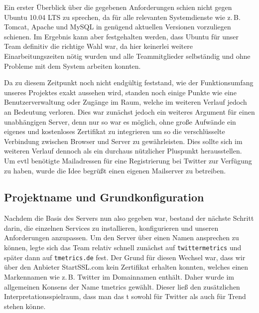 Ein erster Überblick über die gegebenen Anforderungen schien nicht gegen Ubuntu 10.04 LTS zu sprechen, da für alle relevanten Systemdienste wie z.\,B. Tomcat, Apache und MySQL in genügend aktuellen Versionen vorzuliegen schienen.
Im Ergebnis kann aber festgehalten werden, dass Ubuntu für unser Team definitiv die richtige Wahl war, da hier keinerlei weitere Einarbeitungszeiten nötig wurden und alle Teammitglieder selbständig und ohne Probleme mit dem System arbeiten konnten.

Da zu diesem Zeitpunkt noch nicht endgültig feststand, wie der Funktionsumfang unseres Projektes exakt aussehen wird, standen noch einige Punkte wie eine Benutzerverwaltung oder Zugänge im Raum, welche im weiteren Verlauf jedoch an Bedeutung verloren. Dies war zunächst jedoch ein weiteres Argument für einen unabhängigen Server, denn nur so war es möglich, ohne große Aufwände ein eigenes und kostenloses Zertifikat zu integrieren um so die verschlüsselte Verbindung zwischen Browser und Server zu gewährleisten. Dies sollte sich im weiteren Verlauf dennoch als ein durchaus nützlicher Pluspunkt herausstellen.
Um evtl benötigte Mailadressen für eine Registrierung bei Twitter zur Verfügung zu haben, wurde die Idee begrüßt einen eigenen Mailserver zu betreiben.

\subsection{Projektname und Grundkonfiguration}
Nachdem die Basis des Servers nun also gegeben war, bestand der nächste Schritt darin, die einzelnen Services zu installieren, konfigurieren und unseren Anforderungen anzupassen.
Um den Server über einen Namen ansprechen zu können, legte sich das Team relativ schnell zunächst auf \texttt{twittermetrics} und später dann auf \texttt{tmetrics.de} fest. Der Grund für diesen Wechsel war, dass wir über den Anbieter StartSSL.com kein Zertifikat erhalten konnten, welches einen Markennamen wie z.\,B. Twitter im Domainnamen enthält. Daher wurde im allgemeinen Konsens der Name tmetrics gewählt. Dieser ließ den zusätzlichen Interpretationsspielraum, dass man das t sowohl für Twitter als auch für Trend stehen könne.

